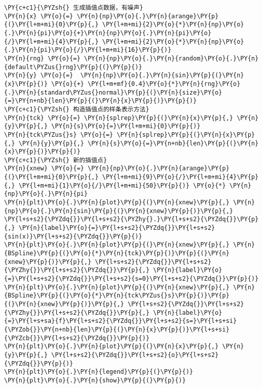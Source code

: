     \begin{tcolorbox}[breakable, size=fbox, boxrule=1pt, pad at break*=1mm,colback=cellbackground, colframe=cellborder]
\begin{Verbatim}[commandchars=\\\{\}]
\PY{c+c1}{\PYZsh{} 生成插值点数据，有噪声}
\PY{n}{x} \PY{o}{=} \PY{n}{np}\PY{o}{.}\PY{n}{arange}\PY{p}{(}\PY{l+m+mi}{0}\PY{p}{,} \PY{l+m+mi}{2}\PY{o}{*}\PY{n}{np}\PY{o}{.}\PY{n}{pi}\PY{o}{+}\PY{n}{np}\PY{o}{.}\PY{n}{pi}\PY{o}{/}\PY{l+m+mi}{4}\PY{p}{,} \PY{l+m+mi}{2}\PY{o}{*}\PY{n}{np}\PY{o}{.}\PY{n}{pi}\PY{o}{/}\PY{l+m+mi}{16}\PY{p}{)}
\PY{n}{rng} \PY{o}{=} \PY{n}{np}\PY{o}{.}\PY{n}{random}\PY{o}{.}\PY{n}{default\PYZus{}rng}\PY{p}{(}\PY{p}{)}
\PY{n}{y} \PY{o}{=}  \PY{n}{np}\PY{o}{.}\PY{n}{sin}\PY{p}{(}\PY{n}{x}\PY{p}{)} \PY{o}{+} \PY{l+m+mf}{0.4}\PY{o}{*}\PY{n}{rng}\PY{o}{.}\PY{n}{standard\PYZus{}normal}\PY{p}{(}\PY{n}{size}\PY{o}{=}\PY{n+nb}{len}\PY{p}{(}\PY{n}{x}\PY{p}{)}\PY{p}{)}
\PY{c+c1}{\PYZsh{} 构造插值点的样条表示方法}
\PY{n}{tck} \PY{o}{=} \PY{n}{splrep}\PY{p}{(}\PY{n}{x}\PY{p}{,} \PY{n}{y}\PY{p}{,} \PY{n}{s}\PY{o}{=}\PY{l+m+mi}{0}\PY{p}{)}
\PY{n}{tck\PYZus{}s} \PY{o}{=} \PY{n}{splrep}\PY{p}{(}\PY{n}{x}\PY{p}{,} \PY{n}{y}\PY{p}{,} \PY{n}{s}\PY{o}{=}\PY{n+nb}{len}\PY{p}{(}\PY{n}{x}\PY{p}{)}\PY{p}{)}
\PY{c+c1}{\PYZsh{} 新的插值点}
\PY{n}{xnew} \PY{o}{=} \PY{n}{np}\PY{o}{.}\PY{n}{arange}\PY{p}{(}\PY{l+m+mi}{0}\PY{p}{,} \PY{l+m+mi}{9}\PY{o}{/}\PY{l+m+mi}{4}\PY{p}{,} \PY{l+m+mi}{1}\PY{o}{/}\PY{l+m+mi}{50}\PY{p}{)} \PY{o}{*} \PY{n}{np}\PY{o}{.}\PY{n}{pi}
\PY{n}{plt}\PY{o}{.}\PY{n}{plot}\PY{p}{(}\PY{n}{xnew}\PY{p}{,} \PY{n}{np}\PY{o}{.}\PY{n}{sin}\PY{p}{(}\PY{n}{xnew}\PY{p}{)}\PY{p}{,} \PY{l+s+s2}{\PYZdq{}}\PY{l+s+s2}{\PYZhy{}.}\PY{l+s+s2}{\PYZdq{}}\PY{p}{,} \PY{n}{label}\PY{o}{=}\PY{l+s+s2}{\PYZdq{}}\PY{l+s+s2}{sin(x)}\PY{l+s+s2}{\PYZdq{}}\PY{p}{)}
\PY{n}{plt}\PY{o}{.}\PY{n}{plot}\PY{p}{(}\PY{n}{xnew}\PY{p}{,} \PY{n}{BSpline}\PY{p}{(}\PY{o}{*}\PY{n}{tck}\PY{p}{)}\PY{p}{(}\PY{n}{xnew}\PY{p}{)}\PY{p}{,} \PY{l+s+s2}{\PYZdq{}}\PY{l+s+s2}{\PYZhy{}}\PY{l+s+s2}{\PYZdq{}}\PY{p}{,} \PY{n}{label}\PY{o}{=}\PY{l+s+s2}{\PYZdq{}}\PY{l+s+s2}{s=0}\PY{l+s+s2}{\PYZdq{}}\PY{p}{)}
\PY{n}{plt}\PY{o}{.}\PY{n}{plot}\PY{p}{(}\PY{n}{xnew}\PY{p}{,} \PY{n}{BSpline}\PY{p}{(}\PY{o}{*}\PY{n}{tck\PYZus{}s}\PY{p}{)}\PY{p}{(}\PY{n}{xnew}\PY{p}{)}\PY{p}{,} \PY{l+s+s2}{\PYZdq{}}\PY{l+s+s2}{\PYZhy{}}\PY{l+s+s2}{\PYZdq{}}\PY{p}{,} \PY{n}{label}\PY{o}{=}\PY{l+s+sa}{f}\PY{l+s+s2}{\PYZdq{}}\PY{l+s+s2}{s=}\PY{l+s+si}{\PYZob{}}\PY{n+nb}{len}\PY{p}{(}\PY{n}{x}\PY{p}{)}\PY{l+s+si}{\PYZcb{}}\PY{l+s+s2}{\PYZdq{}}\PY{p}{)}
\PY{n}{plt}\PY{o}{.}\PY{n}{plot}\PY{p}{(}\PY{n}{x}\PY{p}{,} \PY{n}{y}\PY{p}{,} \PY{l+s+s2}{\PYZdq{}}\PY{l+s+s2}{o}\PY{l+s+s2}{\PYZdq{}}\PY{p}{)}
\PY{n}{plt}\PY{o}{.}\PY{n}{legend}\PY{p}{(}\PY{p}{)}
\PY{n}{plt}\PY{o}{.}\PY{n}{show}\PY{p}{(}\PY{p}{)}
\end{Verbatim}
\end{tcolorbox}

    \begin{center}
    \end{center}
    { \hspace*{\fill} \\}
